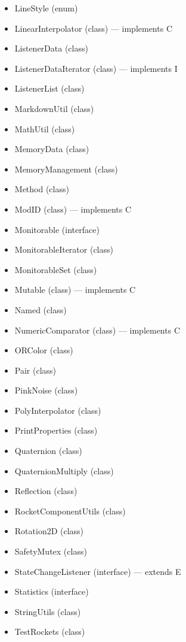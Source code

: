 \documentclass{amsdtx}
\begin{document}
\begin{itemize}
\begin{itemize}
\begin{itemize}
      LimitedInputStream (class) --- extends F
    \item
      LineStyle (enum)
    \item
      LinearInterpolator (class) --- implements C
    \item
      ListenerData (class)
    \item
      ListenerDataIterator (class) --- implements I
    \item
      ListenerList (class)
    \item
      MarkdownUtil (class)
    \item
      MathUtil (class)
    \item
      MemoryData (class)
    \item
      MemoryManagement (class)
    \item
      Method (class)
    \item
      ModID (class) --- implements C
    \item
      Monitorable (interface)
    \item
      MonitorableIterator (class)
    \item
      MonitorableSet (class)
    \item
      Mutable (class) --- implements C
    \item
      Named (class)
    \item
      NumericComparator (class) --- implements C
    \item
      ORColor (class)
    \item
      Pair (class)
    \item
      PinkNoise (class)
    \item
      PolyInterpolator (class)
    \item
      PrintProperties (class)
    \item
      Quaternion (class)
    \item
      QuaternionMultiply (class)
    \item
      Reflection (class)
    \item
      RocketComponentUtils (class)
    \item
      Rotation2D (class)
    \item
      SafetyMutex (class)
    \item
      StateChangeListener (interface) --- extends E
    \item
      Statistics (interface)
    \item
      StringUtils (class)
    \item
      TestRockets (class)

\end{itemize}
\end{itemize}
\end{itemize}
\end{document}
